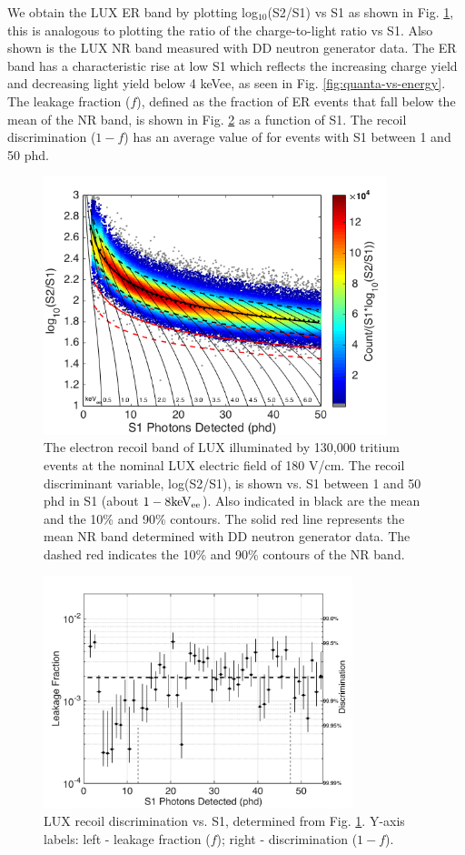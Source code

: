 We obtain the LUX ER band by plotting log$_{10}$(S2/S1) vs S1 as shown in Fig. \ref{fig:ER_band}, this is analogous to plotting the ratio of the charge-to-light ratio vs S1. Also shown is the LUX NR band measured with DD neutron generator data. The ER band has a characteristic rise at low S1 which reflects the increasing charge yield and decreasing light yield below 4 keVee, as seen in Fig. \ref{fig:quanta-vs-energy}. The leakage fraction ($f$), defined as the fraction of ER events that fall below the mean of the NR band, is shown in Fig. \ref{fig:Leak} as a function of S1. The recoil discrimination ($1-f$) has an average value of  for events with S1 between 1 and 50 phd.

\begin{figure}[h!]\centering
\includegraphics[width=100mm]{fig/CH3T_ER_Band.png}
\caption{The electron recoil band of LUX illuminated by 130,000 tritium events at the nominal LUX electric field of 180 V/cm.  The recoil discriminant variable, log(S2/S1), is shown vs. S1 between 1 and 50 phd in S1 (about $\rm1-8 keV_{ee}$). Also indicated in black are the mean and the 10\% and 90\% contours. The solid red line represents the mean NR band determined with DD neutron generator data. The dashed red indicates the 10\% and 90\% contours of the NR band.}
\label{fig:ER_band}
\end{figure}

\begin{figure}[h!]\centering
\includegraphics[width=90mm]{fig/CH3T_Leakage_Run03.png}
\caption{LUX recoil discrimination vs. S1, determined from Fig. \ref{fig:ER_band}. Y-axis labels: left -  leakage fraction ($f$); right - discrimination ($1-f$).}
\label{fig:Leak}
\end{figure}


